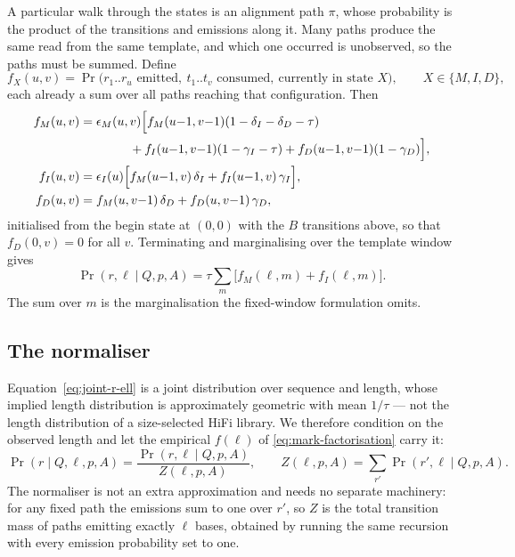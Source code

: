 \documentclass[11pt]{article}
\newcommand{\Prob}{\Pr}
\begin{document}
A particular walk through the states is an alignment path $\pi$, whose
probability is the product of the transitions and emissions along it.  Many
paths produce the same read from the same template, and which one occurred is
unobserved, so the paths must be summed.  Define
\begin{equation}
    f_X(u,v) = \Prob\big(r_1..r_u \text{ emitted},\ t_1..t_v \text{ consumed},\
    \text{currently in state } X\big),
    \qquad X \in \{M,I,D\},
\end{equation}
each already a sum over all paths reaching that configuration.  Then
\begin{align}
    f_M(u,v) &= \epsilon_M(u,v)\Big[
        f_M(u{-}1,v{-}1)(1-\delta_I-\delta_D-\tau) \notag \\
      &\qquad\qquad
      + f_I(u{-}1,v{-}1)(1-\gamma_I-\tau)
      + f_D(u{-}1,v{-}1)(1-\gamma_D)\Big], \\
    f_I(u,v) &= \epsilon_I(u)\Big[f_M(u{-}1,v)\,\delta_I + f_I(u{-}1,v)\,\gamma_I\Big], \\
    f_D(u,v) &= f_M(u,v{-}1)\,\delta_D + f_D(u,v{-}1)\,\gamma_D,
\end{align}
initialised from the begin state at $(0,0)$ with the $B$ transitions above, so
that $f_D(0,v) = 0$ for all $v$.
Terminating and marginalising over the template window gives
\begin{equation}
    \Prob(r,\ell \mid Q, p, A)
    = \tau \sum_{m} \big[f_M(\ell,m) + f_I(\ell,m)\big].
\label{eq:joint-r-ell}
\end{equation}
The sum over $m$ is the marginalisation the fixed-window formulation omits.

\subsection{The normaliser}
\label{sec:normaliser}

Equation~\eqref{eq:joint-r-ell} is a joint distribution over sequence and
length, whose implied length distribution is approximately geometric with mean
$1/\tau$ --- not the length distribution of a size-selected HiFi library.  We
therefore condition on the observed length and let the empirical $f(\ell)$ of
\eqref{eq:mark-factorisation} carry it:
\begin{equation}
    \Prob(r \mid Q,\ell,p,A) = \frac{\Prob(r,\ell\mid Q,p,A)}{Z(\ell,p,A)},
    \qquad
    Z(\ell,p,A) = \sum_{r'} \Prob(r',\ell\mid Q,p,A).
\end{equation}
The normaliser is not an extra approximation and needs no separate machinery:
for any fixed path the emissions sum to one over $r'$, so $Z$ is the total
transition mass of paths emitting exactly $\ell$ bases, obtained by running the
same recursion with every emission probability set to one.
\end{document}
